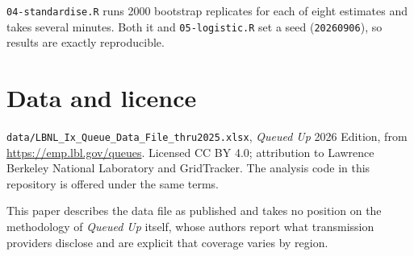\documentclass[11pt,a4paper]{article}
\begin{document}
\texttt{04-standardise.R} runs \num{2000} bootstrap replicates for each of eight
estimates and takes several minutes. Both it and \texttt{05-logistic.R} set a
seed (\texttt{20260906}), so results are exactly reproducible.

\section*{Data and licence}

\texttt{data/LBNL\_Ix\_Queue\_Data\_File\_thru2025.xlsx}, \emph{Queued Up} 2026
Edition, from \url{https://emp.lbl.gov/queues}. Licensed CC BY 4.0; attribution
to Lawrence Berkeley National Laboratory and GridTracker. The analysis code in
this repository is offered under the same terms.

This paper describes the data file as published and takes no position on the
methodology of \emph{Queued Up} itself, whose authors report what transmission
providers disclose and are explicit that coverage varies by region.
\end{document}
